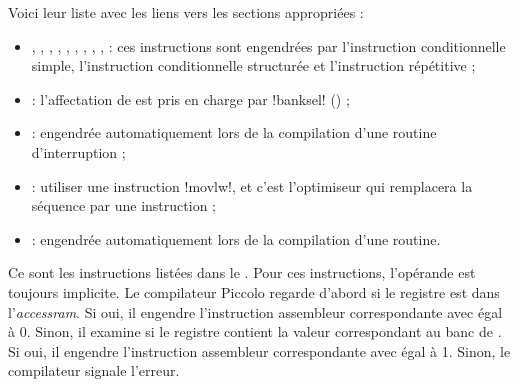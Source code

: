 Voici leur liste avec les liens vers les sections appropriées :\begin{itemize}
  \item {}, , , , , , , , ,  : ces instructions sont engendrées par l’instruction conditionnelle simple, l’instruction conditionnelle structurée et l’instruction répétitive ;
  \item {} : l’affectation de  est pris en charge par \pic!banksel! () ;
  \item {} : engendrée automatiquement lors de la compilation d’une routine d’interruption ;
  \item {} : utiliser une instruction \pic!movlw!, et c’est l’optimiseur qui remplacera la séquence  par une instruction  ;
  \item {} : engendrée automatiquement lors de la compilation d’une routine.

\end{itemize}








Ce sont les instructions listées dans le . Pour ces instructions, l'opérande  est toujours implicite. Le compilateur Piccolo regarde d'abord si le registre  est dans l'\emph{accessram}. Si oui, il engendre l'instruction assembleur correspondante avec  égal à 0. Sinon, il examine si le registre  contient la valeur correspondant au banc de . Si oui, il engendre l'instruction assembleur correspondante avec  égal à 1. Sinon, le compilateur signale l'erreur.



